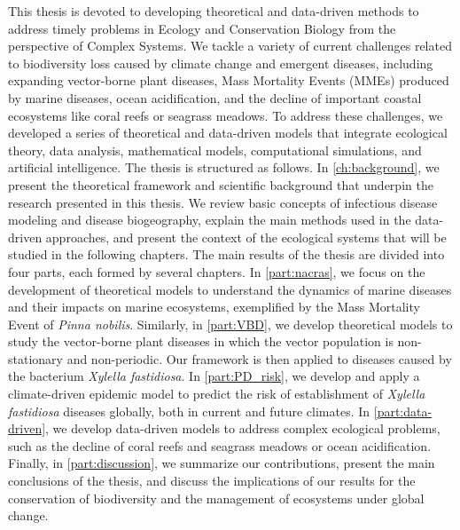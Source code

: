 This thesis is devoted to developing theoretical and data-driven methods to
address timely problems in Ecology and Conservation Biology from the
perspective of Complex Systems. We tackle a variety of current challenges
related to biodiversity loss caused by climate change and emergent diseases,
including expanding vector-borne plant diseases, Mass Mortality Events (MMEs)
produced by marine diseases, ocean acidification, and the decline of important
coastal ecosystems like coral reefs or seagrass meadows. To address these
challenges, we developed a series of theoretical and data-driven models that
integrate ecological theory, data analysis, mathematical models, computational
simulations, and artificial intelligence. The thesis is structured as follows.
In \cref{ch:background}, we present the theoretical framework and scientific
background that underpin the research presented in this thesis. We review
basic concepts of infectious disease modeling and disease biogeography,
explain the main methods used in the data-driven approaches, and present the
context of the ecological systems that will be studied in the following
chapters. The main results of the thesis are divided into four parts, each
formed by several chapters. In \cref{part:nacras}, we focus on the development
of theoretical models to understand the dynamics of marine diseases and their
impacts on marine ecosystems, exemplified by the Mass Mortality Event of
\textit{Pinna nobilis}. Similarly, in \cref{part:VBD}, we develop theoretical
models to study the vector-borne plant diseases in which the vector population
is non-stationary and non-periodic. Our framework is then applied to diseases
caused by the bacterium \textit{Xylella fastidiosa}. In \cref{part:PD_risk}, we
develop and apply a climate-driven epidemic model to predict the risk of
establishment of \textit{Xylella fastidiosa} diseases globally, both in current
and future climates. In \cref{part:data-driven}, we develop data-driven models
to address complex ecological problems, such as the decline of coral reefs and
seagrass meadows or ocean acidification. Finally, in \cref{part:discussion}, we
summarize our contributions, present the main conclusions of the thesis, and
discuss the implications of our results for the conservation of biodiversity
and the management of ecosystems under global change.
